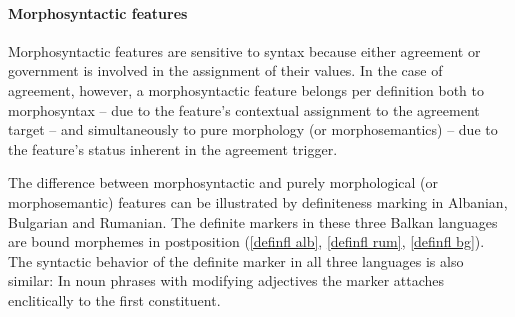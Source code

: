 \paragraph*{Morphosyntactic features} 
Morphosyntactic features are sensitive to syntax because either agreement or government is involved in the assignment of their values. In the case of agreement, however, a morphosyntactic feature belongs per definition both to morphosyntax – due to the feature's contextual assignment to the agreement target – and simultaneously to pure morphology (or morphosemantics) – due to the feature's status inherent in the agreement trigger.

The difference between morphosyntactic and purely morphological (or morphosemantic) features can be illustrated by definiteness marking in Albanian, Bulgarian and Rumanian. The definite markers in these three Balkan languages are bound morphemes in postposition (\ref{definfl alb}, \ref{definfl rum}, \ref{definfl bg}). The syntactic behavior of the definite marker in all three languages is also similar: In noun phrases with modifying adjectives the marker attaches enclitically to the first constituent. 
